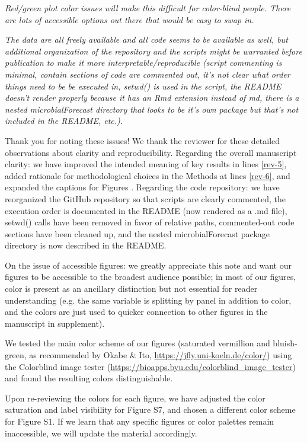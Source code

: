 \documentclass[11pt]{article}
\begin{document}
\textit{Red/green plot color issues will make this difficult for color-blind people. There are lots of accessible options out there that would be easy to swap in.}

\textit{The data are all freely available and all code seems to be available as well, but additional organization of the repository and the scripts might be warranted before publication to make it more interpretable/reproducible (script commenting is minimal, contain sections of code are commented out, it's not clear what order things need to be be executed in, setwd() is used in the script, the README doesn't render properly because it has an Rmd extension instead of md, there is a nested microbialForecast directory that looks to be it's own package but that's not included in the README, etc.).}

Thank you for noting these issues! We thank the reviewer for these detailed observations about clarity and reproducibility. Regarding the overall manuscript clarity: we have improved the intended meaning of key results in lines \ref{rev-5}, added rationale for methodological choices in the Methods at lines \ref{rev-6}, and expanded the captions for Figures %
. Regarding the code repository: we have reorganized the GitHub repository so that scripts are clearly commented, the execution order is documented in the README (now rendered as a .md file), setwd() calls have been removed in favor of relative paths, commented-out code sections have been cleaned up, and the nested microbialForecast package directory is now described in the README.

On the issue of accessible figures: we greatly appreciate this note and want our figures to be accessible to the broadest audience possible; in most of our figures, color is present as an ancillary distinction but not essential for reader understanding (e.g. the same variable is splitting by panel in addition to color, and the colors are just used to quicker connection to other figures in the manuscript in supplement).

We tested the main color scheme of our figures (saturated vermillion and bluish-green, as recommended by Okabe \& Ito, \url{https://jfly.uni-koeln.de/color/}) using the Colorblind image tester (\url{https://bioapps.byu.edu/colorblind_image_tester}) and found the resulting colors distinguishable.

Upon re-reviewing the colors for each figure, we have adjusted the color saturation and label visibility for Figure S7, and chosen a different color scheme for Figure S1. If we learn that any specific figures or color palettes remain inaccessible, we will update the material accordingly.
\end{document}
